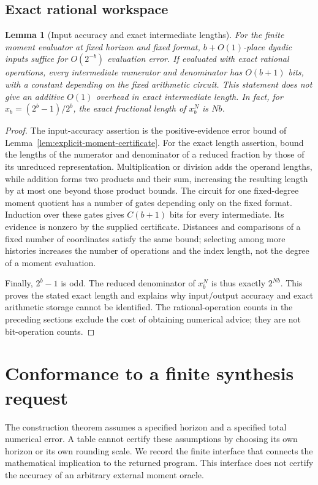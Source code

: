 \documentclass[11pt]{amsart}
\newtheorem{lemma}[theorem]{Lemma}
\theoremstyle{definition}\newtheorem{definition}[theorem]{Definition}
\theoremstyle{remark}\newtheorem{remark}[theorem]{Remark}
\begin{document}
\subsection{Exact rational workspace}
\begin{lemma}[Input accuracy and exact intermediate lengths]
\label{lem:rational-workspace}
For the finite moment evaluator at fixed horizon and fixed format,
$b+O(1)$-place dyadic inputs suffice for $O(2^{-b})$ evaluation error.
If evaluated with exact rational operations, every intermediate numerator
and denominator has $O(b+1)$ bits, with a constant depending on the fixed
arithmetic circuit. This statement does not give an additive $O(1)$
overhead in exact intermediate length. In fact, for
$x_b=(2^b-1)/2^b$, the exact fractional length of $x_b^N$ is $Nb$.
\end{lemma}
\begin{proof}
The input-accuracy assertion is the positive-evidence error bound of
Lemma~\ref{lem:explicit-moment-certificate}. For the exact length
assertion, bound the lengths of the numerator and denominator of a
reduced fraction by those of its unreduced representation. Multiplication
or division adds the operand lengths, while addition forms two products
and their sum, increasing the resulting length by at most one beyond
those product bounds. The circuit for one fixed-degree moment quotient
has a number of gates depending only on the fixed format. Induction over
these gates gives $C(b+1)$ bits for every intermediate. Its evidence is
nonzero by the supplied certificate. Distances and comparisons of a
fixed number of coordinates satisfy the same bound; selecting among
more histories increases the number of operations and the index length,
not the degree of a moment evaluation.

Finally, $2^b-1$ is odd. The reduced denominator of $x_b^N$ is thus
exactly $2^{Nb}$. This proves the stated exact length and explains why
input/output accuracy and exact arithmetic storage cannot be identified.
The rational-operation counts in the preceding sections exclude the
cost of obtaining numerical advice; they are not bit-operation counts.
\end{proof}

\section{Conformance to a finite synthesis request}
\label{sec:request-conformance}
The construction theorem assumes a specified horizon and a specified
total numerical error. A table cannot certify these assumptions by
choosing its own horizon or its own rounding scale. We record the finite
interface that connects the mathematical implication to the returned
program. This interface does not certify the accuracy of an arbitrary
external moment oracle.
\end{document}
